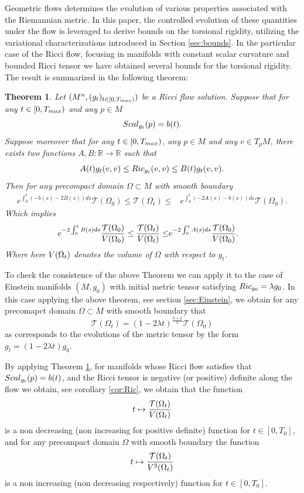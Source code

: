 \documentclass{amsart}
\newtheorem{lettertheorem}{Theorem}
\theoremstyle{definition}
\theoremstyle{remark}
\newcommand{\Ric}{{\rm Ric}}
\newcommand{\V}{{\rm V}}
\begin{document}
Geometric flows determines the evolution of various properties associated with the Riemannian metric. In this paper, the controlled evolution of these quantities under the flow is leveraged to derive bounds on the torsional rigidity, utilizing the variational characterizations introduced in Section \ref{sec:bounds}.
In the particular case of the Ricci flow, focusing in manifolds with constant scalar curvature and bounded Ricci tensor we have obtained several bounds for the torsional rigidity. The result is summarized in the following theorem:

\begin{lettertheorem} \label{Thm:Ric}Let $(M^n,(g_t)_{t\in [0,T_{\rm max})})$ be a Ricci flow solution. Suppose that for any $t\in [0,T_{\rm max})$ and any $p\in M$
$$
 {\rm Scal}_{g_t}(p)=b(t).
$$
Suppose moreover that for any $t\in [0,T_{\rm max})$, any $p\in M$ and any $v\in T_pM$, there exists two functions $A,B:\mathbb{R}\to\mathbb{R}$ such that 
$$
A(t)g_t(v,v)\leq {\rm Ric}_{g_t}(v,v)\leq B(t)g_t(v,v). 
$$
Then for any precompact domain $\Omega\subset M$ with smooth boundary 
$$
\begin{aligned}
 e^{\int_0^t\left(-b(s)-2B(s)\right)ds}\mathcal{T}(\Omega_0)\leq\mathcal{T}(\Omega_t)\leq& e^{\int_0^t\left(-2A(s)-b(s)\right)ds}\mathcal{T}(\Omega_0). 
\end{aligned}
$$
Which implies
$$
\begin{aligned}
 e^{-2\int_0^tB(s)ds}\frac{\mathcal{T}(\Omega_0)}{\V(\Omega_0)}\leq\frac{\mathcal{T}(\Omega_t)}{\V(\Omega_t)}\leq& e^{-2\int_0^tA(s)ds}\frac{\mathcal{T}(\Omega_0)}{\V(\Omega_0)}. 
\end{aligned}
$$
Where here  ${\rm V}(\Omega_t)$ denotes the volume of $\Omega$ with respect to $g_t$.
\end{lettertheorem}
To check the consistence of the above Theorem we can apply it to the case of Einstein manifolds $(M,g_0)$ with initial metric tensor satisfying $\Ric_{g_0}=\lambda g_0$. In this case applying the above theorem, see section \ref{sec:Einstein}, we obtain for any precomapct domain $\Omega\subset M$ with smooth boundary that
$$
    \mathcal{T}(\Omega_t)= \left(1-2\lambda t\right)^{\frac{n+2}{2}}\mathcal{T}(\Omega_0)  
$$
as corresponds to the evolutions of the metric tensor by  the form $g_t= (1-2\lambda t)g_0$.

 By applying Theorem \ref{Thm:Ric}, for manifolds whose Ricci flow satisfies that 
$
 {\rm Scal}_{g_t}(p)=b(t)
$, and the Ricci tensor is negative (or positive) definite along the flow we obtain, see corollary \ref{cor:Ric}, we obtain that the function 
$$
t\mapsto \frac{\mathcal{T}(\Omega_t)}{\V(\Omega_t)}
$$
is a non decreasing (non increasing for positive definite) function for $t\in [0,T_0]$, and for any precompact domain $\Omega$ with smooth boundary the function
$$
t\mapsto \frac{\mathcal{T}(\Omega_t)}{\V^3(\Omega_t)}
$$
is a non increasing (non decreasing respectively) function for $t\in [0,T_0]$.
\end{document}
